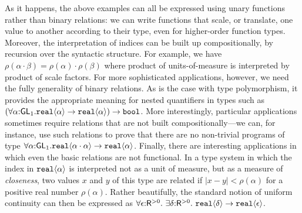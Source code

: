 \vspace*{0.1in}

As it happens, the above examples can all be expressed using unary
functions rather than binary relations: we can write functions that
scale, or translate, one value to another according to their type,
even for higher-order function types. Moreover, the interpretation of
indices can be built up compositionally, by recursion over the
syntactic structure. For example, we have $\rho(\alpha\cdot\beta) =
\rho(\alpha)\cdot\rho(\beta)$ where product of units-of-measure is
interpreted by product of scale factors. For more sophisticated
applications, however, we need the fully generality of binary
relations. As is the case with type polymorphism, it
provides the appropriate meaning for nested quantifiers in types such
as
$(\forall\alpha\mathord:\mathsf{GL}_1.\textup{\texttt{real}}\langle \alpha \rangle\to\textup{\texttt{real}}\langle \alpha \rangle)\to\texttt{bool}$.
More interestingly, particular applications sometimes require
relations that are not built compositionally---we can, for instance,
use such relations to prove that there are no non-trivial programs of
type
$\forall\alpha\mathord:\mathsf{GL}_1.\textup{\texttt{real}}\langle \alpha\cdot\alpha \rangle\to\textup{\texttt{real}}\langle \alpha \rangle$.
Finally, there are interesting applications in which even the basic
relations are not functional. In a type system in which the index in
$\textup{\texttt{real}}\langle \alpha \rangle$ is interpreted not as a unit of measure, but as
a measure of \emph{closeness}, two values $x$ and $y$ of this type are
related if $|x-y| < \rho(\alpha)$ for a positive real number
$\rho(\alpha)$.  Rather beautifully, the standard notion of uniform
continuity can then be expressed as %
 $ \forall \epsilon \mathord: \mathsf{R}^{>0}.\ \exists \delta\mathord: \mathsf{R}^{>0}.\ \tyPrim{real}{\delta} \to \tyPrim{real}{\epsilon}$.



